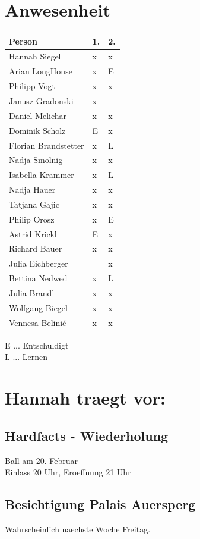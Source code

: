 \documentclass[12pt]{article}
\begin{document}
\ofoot{\pagemark }

\section{Anwesenheit}
  \begin{tabular}{ | p{} | p{} |  p{} |}
    \hline
\textbf{Person} & \textbf{1.} & \textbf{2.}  \\ 
    \hline 
    \hline
 
Hannah Siegel & x & x\\ \hline
Arian LongHouse & x & E \\ \hline
Philipp Vogt & x & x\\ \hline
Janusz Gradonski & x & \\ \hline
Daniel Melichar & x &x \\ \hline
Dominik Scholz & E & x\\ \hline
Florian Brandstetter & x & L \\ \hline
Nadja Smolnig & x & x\\ \hline
Isabella Krammer & x & L \\ \hline
Nadja Hauer & x & x \\ \hline
Tatjana Gajic & x & x\\ \hline
Philip Orosz & x & E \\ \hline
Astrid Krickl & E & x \\ \hline
Richard Bauer & x & x \\ \hline
Julia Eichberger & & x\\ \hline
Bettina Nedwed & x & L\\ \hline
Julia Brandl & x & x\\ \hline
Wolfgang Biegel  & x &x \\ \hline
Vennesa Belinić & x &x \\ \hline
  \end{tabular}
  E ... Entschuldigt \\
  L ... Lernen
\newpage
\section{Hannah traegt vor:}
\subsection{Hardfacts - Wiederholung}
Ball am 20. Februar \\
Einlass 20 Uhr, Eroeffnung 21 Uhr
\subsection{Besichtigung Palais Auersperg}
Wahrscheinlich naechste Woche Freitag.
\end{document}
